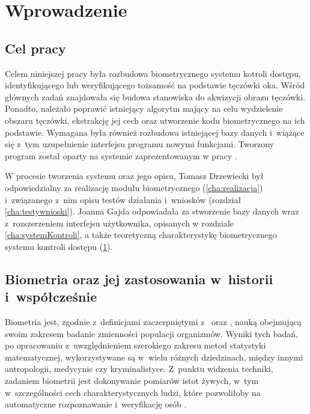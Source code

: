 \chapter{Wprowadzenie}
\label{cha:wprowadzenie}


\section{Cel pracy}
\label{sec:cel}
Celem niniejszej pracy była rozbudowa biometrycznego systemu kotroli dostępu, identyfikującego lub weryfikującego tożsamość na podstawie tęczówki oka. Wśród głównych zadań znajdowała się budowa stanowiska do akwizycji obrazu tęczówki. Ponadto, należało poprawić istniejący algorytm mający na celu wydzielenie obszaru tęczówki, ekstrakcję jej cech oraz utworzenie kodu biometrycznego na ich podstawie. Wymagana była również rozbudowa istniejącej bazy danych i~wiążące się z~tym uzupełnienie interfejsu programu nowymi funkcjami. Tworzony program został oparty na systemie zaprezentowanym w pracy \cite{Gl11}.

W procesie tworzenia systemu oraz jego opisu, Tomasz Drzewiecki był odpowiedzialny za realizację modułu biometrycznego (\ref{cha:realizacja}) i~związanego z~nim opisu testów działania i~wniosków (rozdział \ref{cha:testywnioski}). Joanna Gajda odpowiadała za stworzenie bazy danych wraz z~rozszerzeniem interfejsu użytkownika, opisanych w rozdziale \ref{cha:systemKontroli}, a także teoretyczną charakterystykę biometrycznego systemu kontroli dostępu (\ref{cha:wprowadzenie}).

\section{Biometria oraz jej zastosowania w~historii i~współcześnie}
\label{sec:biometria}

Biometria jest, zgodnie z~definicjami zaczerpniętymi z~\cite{Ko75} oraz \cite{Bio01}, nauką obejmującą swoim zakresem badanie zmienności populacji organizmów. Wyniki tych badań, po opracowaniu z~uwzględnieniem szerokiego zakresu metod statystyki matematycznej, wykorzystywane są w~wielu różnych dziedzinach, między innymi antropologii, medycynie czy kryminalistyce. Z~punktu widzenia techniki, zadaniem biometrii jest dokonywanie pomiarów istot żywych, w~tym w~szczególności cech charakterystycznych ludzi, które pozwoliłoby na automatyczne rozpoznawanie i~weryfikację osób \cite{Bio01}\cite{Jain00}.


